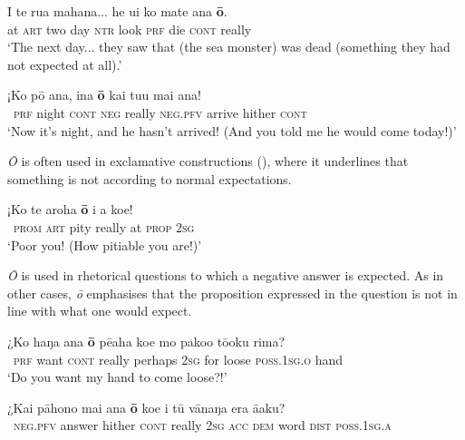 \ea\label{ex:4.184}
\gll {\ꞌ}I te rua mahana... he u{\ꞌ}i ko mate {\ꞌ}ana \textbf{{\ꞌ}ō}. \\
at \textsc{art} two day \textsc{ntr} look \textsc{prf} die \textsc{cont} really \\

\glt 
‘The next day... they saw that (the sea monster) was dead (something they had not expected at all).’ \textstyleExampleref{[R402.015]} 
\z

\ea\label{ex:4.185}
\gll ¡Ko pō {\ꞌ}ana, {\ꞌ}ina \textbf{{\ꞌ}ō} kai tu{\ꞌ}u mai {\ꞌ}ana! \\
~\textsc{prf} night \textsc{cont} \textsc{neg} really \textsc{neg.pfv} arrive hither \textsc{cont} \\

\glt
‘Now it’s night, and he hasn’t arrived! (And you told me he would come today!)’ \textstyleExampleref{[R229.148]} 
\z

\textit{{\ꞌ}Ō} is often used in exclamative constructions (), where it underlines that something is not according to normal expectations.

\ea\label{ex:4.186}
\gll ¡Ko te {\ꞌ}aroha \textbf{{\ꞌ}ō} i a koe! \\
~\textsc{prom} \textsc{art} pity really at \textsc{prop} \textsc{2sg} \\

\glt
‘Poor you! (How pitiable you are!)’ \textstyleExampleref{[R490.018]} 
\z

\textit{{\ꞌ}Ō} is used in rhetorical questions to which a negative answer is expected. As in other cases, \textit{{\ꞌ}ō} emphasises that the proposition expressed in the question is not in line with what one would expect.

\ea\label{ex:4.187}
\gll ¿Ko haŋa {\ꞌ}ana \textbf{{\ꞌ}ō} pēaha koe mo pako{\ꞌ}o tō{\ꞌ}oku rima? \\
~\textsc{prf} want \textsc{cont} really perhaps \textsc{2sg} for loose \textsc{poss.1sg.o} hand \\

\glt 
‘Do you want my hand to come loose?!’ \textstyleExampleref{[R215.020]} 
\z

\ea\label{ex:4.188}
\gll ¿Kai pāhono mai {\ꞌ}ana \textbf{{\ꞌ}ō} koe i tū vānaŋa era {\ꞌ}ā{\ꞌ}aku?\\
~\textsc{neg.pfv} answer hither \textsc{cont} really \textsc{2sg} \textsc{acc} \textsc{dem} word \textsc{dist}\textsc{} \textsc{poss.1sg.a}\\

